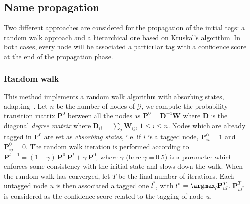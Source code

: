 \subsection{Name propagation}

Two different approaches are considered for the propagation of the initial tags: a random walk approach and a hierarchical one based on Kruskal's algorithm. In both cases, every node will be associated a particular tag with a confidence score at the end of the propagation phase.

\subsubsection{Random walk}

This method implements a random walk algorithm with absorbing states, adapting~\cite{zhu2002}. Let $n$ be the number of nodes of $\mathcal{G}$, we compute the probability transition matrix $\mathbf{P}^0$ between all the nodes as $\mathbf{P}^0 = \mathbf{D}^{-1}\mathbf{W}$ where $\mathbf{D}$ is the diagonal {\it degree matrix} where $\mathbf{D}_{ii} = \sum_j \mathbf{W}_{ij}$, $1\leq i \leq n$. Nodes which are already tagged in $\mathbf{P}^0$ are set as \textit{absorbing states}, i.e. if $i$ is a tagged node, $\mathbf{P}^0_{ii} = 1$ and $\mathbf{P}^0_{ij} = 0$. The random walk iteration is performed according to $\mathbf{P}^{t+1} = (1-\gamma) ~\mathbf{P}^0 ~ \mathbf{P}^{t} + \gamma ~\mathbf{P}^0$, where $\gamma$ (here $\gamma = 0.5$) is a parameter which enforces some consistency with the initial state and slows down the walk. When the random walk has converged, let $T$ be the final number of iterations. Each untagged node $u$ is then associated a tagged one $l^*$, with $l^*=\argmax_l{\mathbf{P}^{T}_{ul}}$. $\mathbf{P}^{T}_{ul^*}$ is considered as the confidence score related to the tagging of node $u$.

